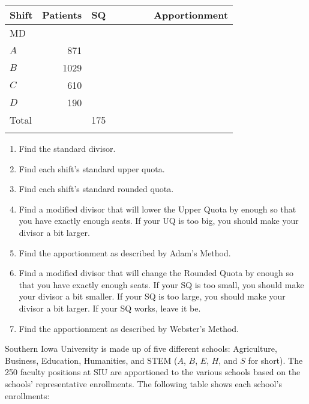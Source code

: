 \begin{Denumerate}
\begin{center}
\begin{tabular}{lr|c|c|c|c|c|c}
	Shift &	Patients & SQ & \hspace{.75cm} 	& \hspace{.75cm}	& \hspace{.75cm} 	&\hspace{.75cm} 	&  	 	Apportionment \\\hline
MD	&&&&&&&\\\hline
	 $A$ &	871 &&&&&&\\\hline
	 $B$ &	1029&&&&&&\\\hline
	 $C$&	610&&&&&&\\\hline
	$D$ &	190&&&&&&\\\hline
	Total & & 175 &&&&&\\\hline\fi
	\end{tabular}
	\normalsize
	\end{center}	
	
	\begin{enumerate}
		\item Find the standard divisor.
		\item Find each shift's standard upper quota. 

		\item Find each shift's standard rounded quota. 
		\item Find a modified divisor that will lower the Upper Quota by enough so that you have exactly enough seats.  If your UQ is too big, you should make your divisor a bit larger.
		\item Find the apportionment as described by Adam's Method.

		\item Find a modified divisor that will change the Rounded Quota by enough so that you have exactly enough seats.  If your SQ is too small,  you should make your divisor a bit smaller.  If your SQ is too large, you should make your divisor a bit larger. If your SQ works, leave it be.
		\item Find the apportionment as described by Webster's Method.
	\end{enumerate} \vfill
\hwnewpage
	\item Southern Iowa University is made up of five different schools: Agriculture, Business, Education, Humanities, and STEM ($A$, $B$, $E$, $H$, and $S$ for short).  The 250 faculty positions at SIU are apportioned to the various schools based on the schools' representative enrollments.  The following table shows each school's enrollments:


\end{Denumerate}
